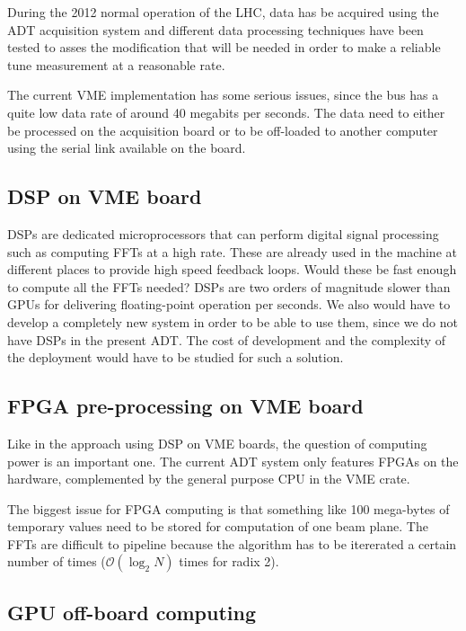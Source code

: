 During the 2012 normal operation of the \gls{LHC}, data has be acquired using the \gls{ADT} acquisition system and different data processing techniques have been tested to asses the modification that will be needed in order to make a reliable \gls{tune} measurement at a reasonable rate\cite{HofleChamonix12}.

The current \gls{VME} implementation has some serious issues, since the bus has a quite low data rate of around 40 megabits per seconds. The data need to either be processed on the acquisition board or to be off-loaded to another computer using the serial link available on the board\cite{Baudrenghien:1124094}.

\subsection{DSP on VME board}

\Glspl{DSP} are dedicated microprocessors that can perform digital signal processing such as computing \glspl{FFT} at a high rate. These are already used in the machine at different places to provide high speed feedback loops. Would these be fast enough to compute all the \glspl{FFT} needed? \glspl{DSP} are two orders of magnitude slower than \glspl{GPU} for delivering floating-point operation per seconds. We also would have to develop a completely new system in order to be able to use them, since we do not have \glspl{DSP} in the present \gls{ADT}. The cost of development and the complexity of the deployment would have to be studied for such a solution.

\subsection{FPGA pre-processing on VME board}

Like in the approach using \gls{DSP} on VME boards, the question of computing power is an important one. The current \gls{ADT} system only features \glspl{FPGA} on the hardware, complemented by the general purpose \gls{CPU} in the \gls{VME} crate.

The biggest issue for \gls{FPGA} computing is that something like 100 mega-bytes of temporary values need to be stored for computation of one beam plane. The \glspl{FFT} are difficult to pipeline because the algorithm has to be itererated a certain number of times ($\mathcal{O}(\log_{2} N)$ times for radix 2).

\subsection{GPU off-board computing}

